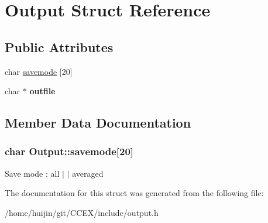 \hypertarget{structOutput}{\section{Output Struct Reference}
\label{structOutput}
}
\subsection*{Public Attributes}
\begin{DoxyCompactItemize}
\item 
char \hyperlink{structOutput_a7f85059a943e07bad7f1b76d4e5a99d8}{savemode} \mbox{[}20\mbox{]}
\item 
\hypertarget{structOutput_a6de083a376f601c5e93b4180ad939d85}{char $\ast$ {\bfseries outfile}}\label{structOutput_a6de083a376f601c5e93b4180ad939d85}

\end{DoxyCompactItemize}


\subsection{Member Data Documentation}
\hypertarget{structOutput_a7f85059a943e07bad7f1b76d4e5a99d8}{
\subsubsection[{savemode}]{\setlength{\rightskip}{0pt plus 5cm}char Output\-::savemode\mbox{[}20\mbox{]}}}\label{structOutput_a7f85059a943e07bad7f1b76d4e5a99d8}
Save mode \-: all $|$ $|$ averaged 

The documentation for this struct was generated from the following file\-:\begin{DoxyCompactItemize}
\item 
/home/huijin/git/\-C\-C\-E\-X/include/output.\-h\end{DoxyCompactItemize}
